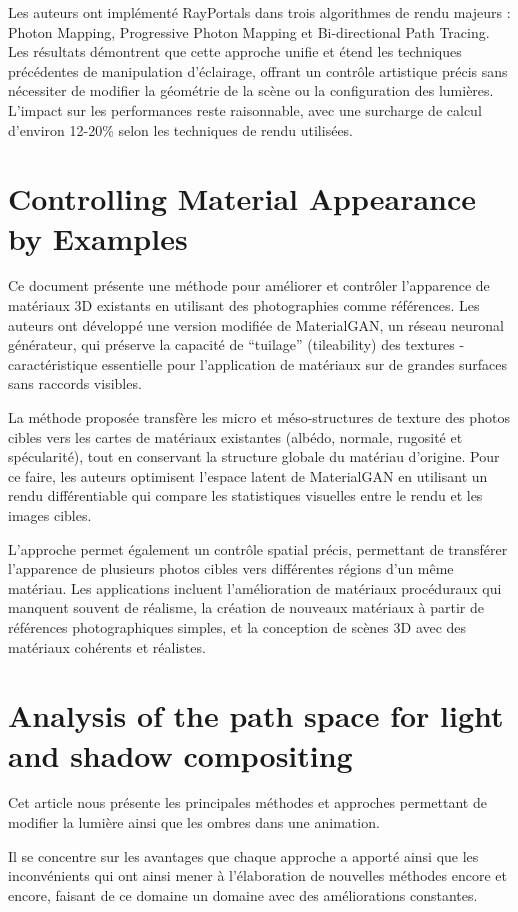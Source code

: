\documentclass{article}
\begin{document}
Les auteurs ont implémenté RayPortals dans trois algorithmes de rendu majeurs : Photon Mapping, Progressive Photon Mapping et Bi-directional Path Tracing. Les résultats démontrent que cette approche unifie et étend les techniques précédentes de manipulation d'éclairage, offrant un contrôle artistique précis sans nécessiter de modifier la géométrie de la scène ou la configuration des lumières. L'impact sur les performances reste raisonnable, avec une surcharge de calcul d'environ 12-20\% selon les techniques de rendu utilisées.

\newpage
\section{Controlling Material Appearance by Examples}
Ce document présente une méthode pour améliorer et contrôler l'apparence de matériaux 3D existants en utilisant des photographies comme références. Les auteurs ont développé une version modifiée de MaterialGAN, un réseau neuronal générateur, qui préserve la capacité de ``tuilage'' (tileability) des textures - caractéristique essentielle pour l'application de matériaux sur de grandes surfaces sans raccords visibles.

La méthode proposée transfère les micro et méso-structures de texture des photos cibles vers les cartes de matériaux existantes (albédo, normale, rugosité et spécularité), tout en conservant la structure globale du matériau d'origine. Pour ce faire, les auteurs optimisent l'espace latent de MaterialGAN en utilisant un rendu différentiable qui compare les statistiques visuelles entre le rendu et les images cibles.

L'approche permet également un contrôle spatial précis, permettant de transférer l'apparence de plusieurs photos cibles vers différentes régions d'un même matériau. Les applications incluent l'amélioration de matériaux procéduraux qui manquent souvent de réalisme, la création de nouveaux matériaux à partir de références photographiques simples, et la conception de scènes 3D avec des matériaux cohérents et réalistes.

\newpage
\section{Analysis of the path space for light and shadow compositing}
Cet article nous présente les principales méthodes et approches permettant de modifier la lumière ainsi que les ombres dans une animation.

Il se concentre sur les avantages que chaque approche a apporté ainsi que les inconvénients qui ont ainsi mener à l’élaboration de nouvelles méthodes encore et encore, faisant de ce domaine un domaine avec des améliorations constantes.
\end{document}
